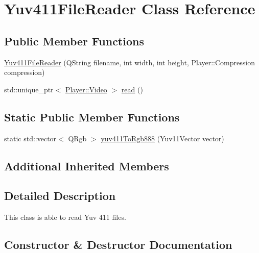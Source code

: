 \hypertarget{classPlayer_1_1Yuv411FileReader}{}\section{Yuv411\+File\+Reader Class Reference}
\label{classPlayer_1_1Yuv411FileReader}
\subsection*{Public Member Functions}
\begin{DoxyCompactItemize}
\item 
\hyperlink{classPlayer_1_1Yuv411FileReader_a0b03e258cd5c5a44fb931cc66384e9aa}{Yuv411\+File\+Reader} (Q\+String filename, int width, int height, Player\+::\+Compression compression)
\item 
std\+::unique\+\_\+ptr$<$ \hyperlink{classPlayer_1_1Video}{Player\+::\+Video} $>$ \hyperlink{classPlayer_1_1Yuv411FileReader_aa4ccefe92119bf1d8879e9e219af8f93}{read} ()
\end{DoxyCompactItemize}
\subsection*{Static Public Member Functions}
\begin{DoxyCompactItemize}
\item 
static std\+::vector$<$ Q\+Rgb $>$ \hyperlink{classPlayer_1_1Yuv411FileReader_af6d2712d6e14bd1bb6cd0b7658ad71fb}{yuv411\+To\+Rgb888} (Yuv11\+Vector vector)
\end{DoxyCompactItemize}
\subsection*{Additional Inherited Members}


\subsection{Detailed Description}
This class is able to read Yuv 411 files. 

\subsection{Constructor \& Destructor Documentation}
\hypertarget{classPlayer_1_1Yuv411FileReader_a0b03e258cd5c5a44fb931cc66384e9aa}{}

